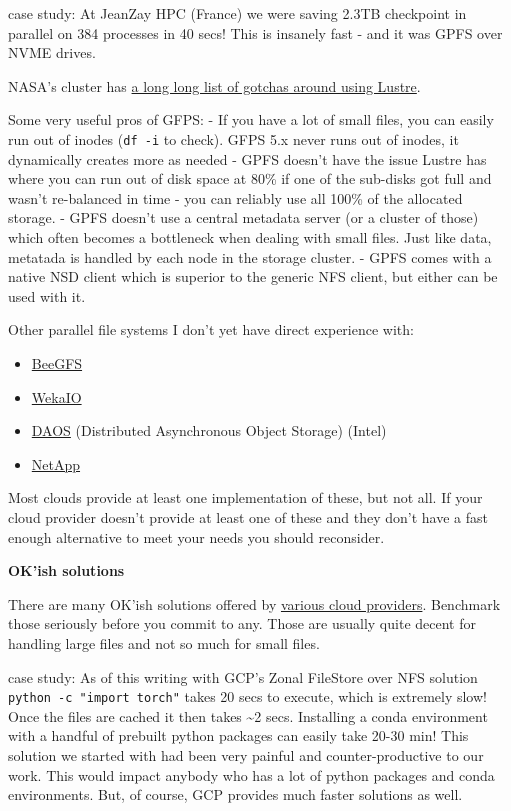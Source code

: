 \documentclass[
]{report}
\providecommand{\tightlist}{%
  \setlength{\itemsep}{0pt}\setlength{\parskip}{0pt}}\usepackage{longtable,booktabs,array}
\begin{document}
case study: At JeanZay HPC (France) we were saving 2.3TB checkpoint in
parallel on 384 processes in 40 secs! This is insanely fast - and it was
GPFS over NVME drives.

NASA's cluster has
\href{https://www.nas.nasa.gov/hecc/support/kb/lustre-best-practices_226.html}{a
long long list of gotchas around using Lustre}.

Some very useful pros of GFPS: - If you have a lot of small files, you
can easily run out of inodes (\texttt{df\ -i} to check). GFPS 5.x never
runs out of inodes, it dynamically creates more as needed - GPFS doesn't
have the issue Lustre has where you can run out of disk space at 80\% if
one of the sub-disks got full and wasn't re-balanced in time - you can
reliably use all 100\% of the allocated storage. - GPFS doesn't use a
central metadata server (or a cluster of those) which often becomes a
bottleneck when dealing with small files. Just like data, metatada is
handled by each node in the storage cluster. - GPFS comes with a native
NSD client which is superior to the generic NFS client, but either can
be used with it.

Other parallel file systems I don't yet have direct experience with:

\begin{itemize}
\tightlist
\item
  \href{https://www.beegfs.io/}{BeeGFS}
\item
  \href{https://www.weka.io/}{WekaIO}
\item
  \href{https://docs.daos.io/}{DAOS} (Distributed Asynchronous Object
  Storage) (Intel)
\item
  \href{https://www.netapp.com}{NetApp}
\end{itemize}

Most clouds provide at least one implementation of these, but not all.
If your cloud provider doesn't provide at least one of these and they
don't have a fast enough alternative to meet your needs you should
reconsider.

\textbf{OK'ish solutions}

There are many OK'ish solutions offered by
\hyperref[cloud-shared-storage-solutions]{various cloud providers}.
Benchmark those seriously before you commit to any. Those are usually
quite decent for handling large files and not so much for small files.

case study: As of this writing with GCP's Zonal FileStore over NFS
solution \texttt{python\ -c\ "import\ torch"} takes 20 secs to execute,
which is extremely slow! Once the files are cached it then takes
\textasciitilde2 secs. Installing a conda environment with a handful of
prebuilt python packages can easily take 20-30 min! This solution we
started with had been very painful and counter-productive to our work.
This would impact anybody who has a lot of python packages and conda
environments. But, of course, GCP provides much faster solutions as
well.
\end{document}
